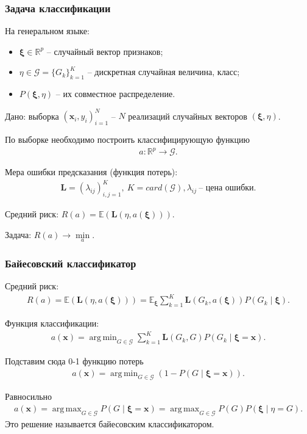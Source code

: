 \documentclass{beamer}
\DeclareMathOperator*{\argmin}{arg\,min}
\DeclareMathOperator*{\argmax}{arg\,max}
\begin{document}
  \begin{frame}
    \frametitle{Задача классификации}
    На генеральном языке:
    \begin{itemize}
      \item $\boldsymbol{\xi} \in \mathbb{R}^p$ -- случайный вектор признаков;
      \item $\eta \in \mathcal{G} = \{G_k\}_{k = 1}^K$ -- дискретная случайная величина, класс;
      \item $P(\boldsymbol{\xi}, \eta)$ -- их совместное распределение.
    \end{itemize}
    \bigskip
    Дано: выборка $(\mathbf{x}_i, y_i)_{i = 1}^N$ -- $N$ реализаций случайных векторов $(\boldsymbol{\xi}, \eta)$.

    \bigskip
    По выборке необходимо построить классифицирующую функцию
    \begin{align*}
      a: \mathbb{R}^p \rightarrow \mathcal{G}.
    \end{align*}

    \bigskip
    Мера ошибки предсказания (функция потерь):
    \begin{align*}
      \mathbf{L} = (\lambda_{ij})_{i,j = 1}^K, ~K = card(\mathcal{G}), \lambda_{ij}~\text{-- цена ошибки}.
    \end{align*}

    \bigskip
    Средний риск: $R(a) = \mathds{E}(\mathbf{L}(\eta, a(\boldsymbol{\xi})))$.

    \bigskip
    Задача: $R(a) \rightarrow \min\limits_a$.
\end{frame}
\begin{frame}
\frametitle{Байесовский классификатор}
Средний риск:
\begin{align*}
  R(a) = \mathds{E}(\mathbf{L}(\eta, a(\boldsymbol{\xi}))) = \mathds{E}_{\boldsymbol{\xi}} \sum_{k = 1}^{K} \mathbf{L}(G_k, a(\boldsymbol{\xi})) P(G_k \mid \boldsymbol{\xi}).
\end{align*}

Функция классификации:
\begin{align*}
  a(\mathbf{x}) = \argmin_{G \in \mathcal{G}} \sum_{k = 1}^{K} \mathbf{L}(G_k, G) P(G_k \mid  \boldsymbol{\xi} = \mathbf{x}).
\end{align*}

Подставим сюда 0-1 функцию потерь
\begin{align*}
  a(\mathbf{x}) = \argmin_{G \in \mathcal{G}} (1 - P(G \mid \boldsymbol{\xi} = \mathbf{x})).
\end{align*}

Равносильно
\begin{align*}
  a(\mathbf{x}) = \argmax_{G \in \mathcal{G}} P(G \mid \boldsymbol{\xi} = \mathbf{x}) = \argmax_{G \in \mathcal{G}} P(G)P(\boldsymbol{\xi} \mid \eta = G).
\end{align*}
Это решение называется байесовским классификатором.
\end{frame}
\end{document}

